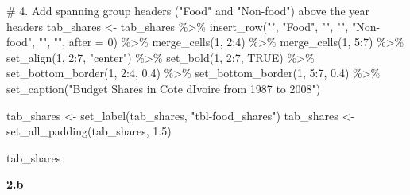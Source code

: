 \documentclass[
  letterpaper,
  DIV=11,
  numbers=noendperiod]{scrartcl}
\newenvironment{Shaded}{\begin{snugshade}}{\end{snugshade}}
\newcommand{\AttributeTok}[1]{\textcolor[rgb]{0.40,0.45,0.13}{#1}}
\newcommand{\CommentTok}[1]{\textcolor[rgb]{0.37,0.37,0.37}{#1}}
\newcommand{\ConstantTok}[1]{\textcolor[rgb]{0.56,0.35,0.01}{#1}}
\newcommand{\DecValTok}[1]{\textcolor[rgb]{0.68,0.00,0.00}{#1}}
\newcommand{\FloatTok}[1]{\textcolor[rgb]{0.68,0.00,0.00}{#1}}
\newcommand{\FunctionTok}[1]{\textcolor[rgb]{0.28,0.35,0.67}{#1}}
\newcommand{\NormalTok}[1]{\textcolor[rgb]{0.00,0.23,0.31}{#1}}
\newcommand{\OtherTok}[1]{\textcolor[rgb]{0.00,0.23,0.31}{#1}}
\newcommand{\SpecialCharTok}[1]{\textcolor[rgb]{0.37,0.37,0.37}{#1}}
\newcommand{\StringTok}[1]{\textcolor[rgb]{0.13,0.47,0.30}{#1}}
\begin{document}
\begin{Shaded}
\begin{Highlighting}[]
\CommentTok{\# 4. Add spanning group headers ("Food" and "Non{-}food") above the year headers}
\NormalTok{tab\_shares }\OtherTok{\textless{}{-}}\NormalTok{ tab\_shares }\SpecialCharTok{\%\textgreater{}\%}
  \FunctionTok{insert\_row}\NormalTok{(}\StringTok{""}\NormalTok{, }\StringTok{"Food"}\NormalTok{, }\StringTok{""}\NormalTok{, }\StringTok{""}\NormalTok{, }\StringTok{"Non{-}food"}\NormalTok{, }\StringTok{""}\NormalTok{, }\StringTok{""}\NormalTok{, }\AttributeTok{after =} \DecValTok{0}\NormalTok{) }\SpecialCharTok{\%\textgreater{}\%}
  \FunctionTok{merge\_cells}\NormalTok{(}\DecValTok{1}\NormalTok{, }\DecValTok{2}\SpecialCharTok{:}\DecValTok{4}\NormalTok{) }\SpecialCharTok{\%\textgreater{}\%}
  \FunctionTok{merge\_cells}\NormalTok{(}\DecValTok{1}\NormalTok{, }\DecValTok{5}\SpecialCharTok{:}\DecValTok{7}\NormalTok{) }\SpecialCharTok{\%\textgreater{}\%}
  \FunctionTok{set\_align}\NormalTok{(}\DecValTok{1}\NormalTok{, }\DecValTok{2}\SpecialCharTok{:}\DecValTok{7}\NormalTok{, }\StringTok{"center"}\NormalTok{) }\SpecialCharTok{\%\textgreater{}\%}
  \FunctionTok{set\_bold}\NormalTok{(}\DecValTok{1}\NormalTok{, }\DecValTok{2}\SpecialCharTok{:}\DecValTok{7}\NormalTok{, }\ConstantTok{TRUE}\NormalTok{) }\SpecialCharTok{\%\textgreater{}\%}
  \FunctionTok{set\_bottom\_border}\NormalTok{(}\DecValTok{1}\NormalTok{, }\DecValTok{2}\SpecialCharTok{:}\DecValTok{4}\NormalTok{, }\FloatTok{0.4}\NormalTok{) }\SpecialCharTok{\%\textgreater{}\%}
  \FunctionTok{set\_bottom\_border}\NormalTok{(}\DecValTok{1}\NormalTok{, }\DecValTok{5}\SpecialCharTok{:}\DecValTok{7}\NormalTok{, }\FloatTok{0.4}\NormalTok{) }\SpecialCharTok{\%\textgreater{}\%}
  \FunctionTok{set\_caption}\NormalTok{(}\StringTok{"Budget Shares in Cote d\textquotesingle{}Ivoire from 1987 to 2008"}\NormalTok{)}


\NormalTok{tab\_shares }\OtherTok{\textless{}{-}} \FunctionTok{set\_label}\NormalTok{(tab\_shares, }\StringTok{"tbl{-}food\_shares"}\NormalTok{)}
\NormalTok{tab\_shares }\OtherTok{\textless{}{-}} \FunctionTok{set\_all\_padding}\NormalTok{(tab\_shares, }\FloatTok{1.5}\NormalTok{)}

\NormalTok{tab\_shares}
\end{Highlighting}
\end{Shaded}

\textbf{2.b}
\end{document}
